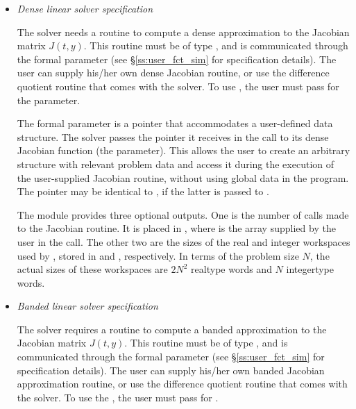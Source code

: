 %
\begin{itemize}
%
%
\item {\em Dense linear solver specification} 

  The 
  {\cvdense} solver needs a routine to compute a dense approximation to
  the Jacobian matrix $J(t,y)$.  This routine must be of type
  , and is communicated through the  
  formal parameter  (see \S\ref{ss:user_fct_sim} for specification
  details).  The user can supply his/her own dense
  Jacobian routine, or use the difference quotient routine  
  that comes with the {\cvdense} solver.  To use , the user 
  must pass  for the  parameter.
  
  The
   formal parameter  is a pointer that
  accommodates a user-defined data structure. The {\cvdense} solver
  passes the pointer it receives in the  call to its dense
  Jacobian function (the  parameter). This allows the user to
  create an arbitrary structure with relevant problem data and access it
  during the execution of the user-supplied Jacobian routine, without
  using global data in the program.  The pointer  may be
  identical to , if the latter is passed to
  .
  
  The {\cvdense} module provides three optional outputs.
  One is the number of calls made to the Jacobian routine. It is placed
  in \id{iopt[}\id{]}, where  is the array supplied by the
  user in the  call.  The other two are the sizes of the
  real and integer workspaces used by {\cvdense}, stored in
  \id{iopt[}\id{]} and \id{iopt[}\id{]},
  respectively.
  In  
  terms of the problem size $N$, the actual sizes of these workspaces are 
  $2N^2$ realtype words and $N$ integertype words.
%
%
\item {\em Banded linear solver specification}
  


  The  
  {\cvband} solver requires a routine to compute a banded approximation
  to the Jacobian matrix $J(t,y)$.  This routine must be of type
  , and is communicated through the  formal 
  parameter  (see \S\ref{ss:user_fct_sim} for specification details).  
  The user can supply his/her own banded Jacobian 
  approximation routine, or use the difference quotient routine 
   
  that comes with the {\cvband} solver.  To use the , the user 
  must pass  for .
  

\end{itemize}
